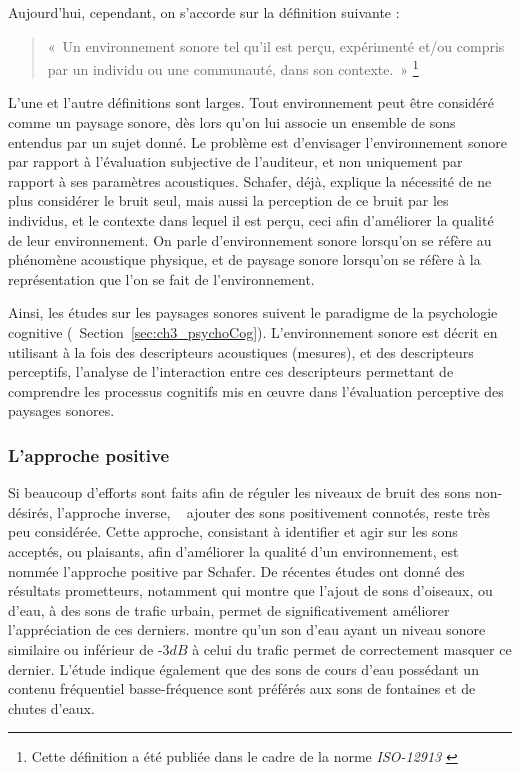 Aujourd'hui, cependant, on s'accorde sur la définition suivante \citep{aletta2016soundscape}:

\begin{quote}
«~Un environnement sonore tel qu'il est perçu, expérimenté et/ou compris par un individu ou une communauté, dans son contexte.~» \footnote{Cette définition a été publiée dans le cadre de la norme \emph{ISO-12913} \citep{iso12913}}
\end{quote}

L'une et l'autre définitions sont larges. Tout environnement peut être considéré comme un paysage sonore, dès lors qu'on lui associe un ensemble de sons entendus par un sujet donné. Le problème est d'envisager l’environnement sonore par rapport à l'évaluation subjective de l'auditeur, et non uniquement par rapport à ses paramètres acoustiques. Schafer, déjà, explique la nécessité de ne plus considérer le bruit seul, mais aussi la perception de ce bruit par les individus, et le contexte dans lequel il est perçu, ceci afin d'améliorer la qualité de leur environnement. On parle d'environnement sonore lorsqu'on se réfère au phénomène acoustique physique, et de paysage sonore lorsqu'on se réfère à la représentation que l'on se fait de l'environnement.

Ainsi, les études sur les paysages sonores suivent le paradigme de la psychologie cognitive \citep{dubois2006cognitive,maffiolo_caracterisation_1999} (\cf~Section~\ref{sec:ch3_psychoCog}). L'environnement sonore est décrit en utilisant à la fois des descripteurs acoustiques (mesures), et des descripteurs perceptifs, l'analyse de l'interaction entre ces descripteurs permettant de comprendre les processus cognitifs mis en œuvre dans l'évaluation perceptive des paysages sonores.

\subsubsection{L'approche positive}

Si beaucoup d’efforts sont faits afin de réguler les niveaux de bruit des sons non-désirés, l'approche inverse, \ie~ ajouter des sons positivement connotés, reste très peu considérée. Cette approche, consistant à identifier et agir sur les sons acceptés, ou plaisants, afin d'améliorer la qualité d'un environnement, est nommée l'approche positive par Schafer. De récentes études ont donné des résultats prometteurs, notamment \citep{hong2013designing} qui montre que l'ajout de sons d'oiseaux, ou d'eau, à des sons de trafic urbain, permet de significativement améliorer l'appréciation de ces derniers. \citep{galbrun2012perceptual} montre qu'un son d'eau ayant un niveau sonore similaire ou inférieur de -3$dB$ à celui du trafic permet de correctement masquer ce dernier. L'étude indique également que des sons de cours d'eau possédant un contenu fréquentiel basse-fréquence sont préférés aux sons de fontaines et de chutes d'eaux.

